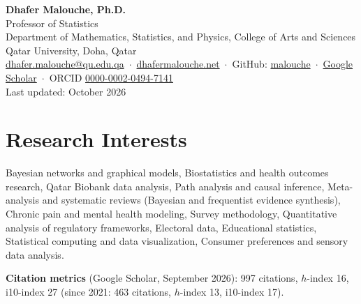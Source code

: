\documentclass[10pt,a4paper]{article}
\begin{document}
\begin{center}
{\LARGE\bfseries Dhafer Malouche, Ph.D.}\\[3pt]
{\large Professor of Statistics}\\[2pt]
Department of Mathematics, Statistics, and Physics, College of Arts and Sciences\\
Qatar University, Doha, Qatar\\[3pt]
\href{mailto:dhafer.malouche@qu.edu.qa}{dhafer.malouche@qu.edu.qa} \,$\cdot$\,
\href{https://dhafermalouche.net}{dhafermalouche.net} \,$\cdot$\,
GitHub: \href{https://github.com/malouche}{malouche} \,$\cdot$\,
\href{https://scholar.google.com/citations?user=LcucwHsAAAAJ&hl=en}{Google Scholar} \,$\cdot$\,
ORCID \href{https://orcid.org/0000-0002-0494-7141}{0000-0002-0494-7141}\\[2pt]
{\small Last updated: October 2026}
\end{center}

\section{Research Interests}
Bayesian networks and graphical models, Biostatistics and health outcomes research, Qatar Biobank data analysis,
Path analysis and causal inference, Meta-analysis and systematic reviews (Bayesian and frequentist evidence synthesis),
Chronic pain and mental health modeling, Survey methodology, Quantitative analysis of regulatory frameworks,
Electoral data, Educational statistics, Statistical computing and data visualization,
Consumer preferences and sensory data analysis.

\textbf{Citation metrics} (Google Scholar, September 2026): 997 citations, $h$-index 16, i10-index 27
(since 2021: 463 citations, $h$-index 13, i10-index 17).

\end{document}
